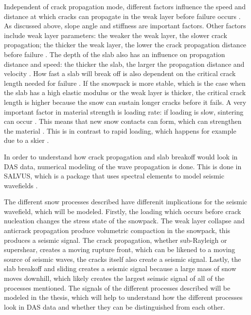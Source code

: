 \documentclass[10pt]{article}
\begin{document}
Independent of crack propagation mode, different factors influence the speed and distance at which cracks can propagate in the weak layer before failure occurs \parencite{gaumeDynamicAnticrackPropagation2018,gaumeSnowFractureRelation2017a,gaumeModelingCrackPropagation2015}. As discussed above, slope angle and stiffness are important factors. Other factors include weak layer parameters: the weaker the weak layer, the slower crack propagation; the thicker the weak layer, the lower the crack propagation distance before failure \parencite{gaumeModelingCrackPropagation2015}. The depth of the slab also has an influence on propagation distance and speed: the thicker the slab, the larger the propagation distance and velocity \parencite{gaumeModelingCrackPropagation2015}. How fast a slab will break off is also dependent on the critical crack length needed for failure \parencite{gaumeSnowFractureRelation2017a}. If the snowpack is more stable, which is the case when the slab has a high elastic modulus or the weak layer is thicker, the critical crack length is higher \parencite{gaumeSnowFractureRelation2017a} because the snow can sustain longer cracks before it fails. A very important factor in material strength is loading rate: if loading is slow, sintering can occur \parencite{mulakNumericalInvestigationMixedmode2019}. This means that new snow contacts can form, which can strengthen the material \parencite{mulakNumericalInvestigationMixedmode2019}. This is in contrast to rapid loading, which happens for example due to a skier \parencite{mulakNumericalInvestigationMixedmode2019}. 


In order to understand how crack propagation and slab breakoff would look in DAS data, numerical modeling of the wave propagation is done. This is done in SALVUS, which is a package that uses spectral elements to model seismic wavefields \parencite{afanasievSalvusFlexibleHighperformance2017}. \par

The different snow processes described have differenit implications for the seismic wavefield, which will be modeled. Firstly, the loading which occurs before crack nucleation changes the stress state of the snowpack. The weak layer collapse and anticrack propagation produce volumetric compaction in the snowpack, this produces a seismic signal. The crack propagation, whether sub-Rayleigh or supershear, creates a moving rupture front, which can be likened to a moving source of seismic waves, the cracks itself also create a seismic signal. Lastly, the slab breakoff and sliding creates a seismic signal because a large mass of snow moves downhill, which likely creates the largest seimsic signal of all of the processes mentioned. The signals of the different processes described will be modeled in the thesis, which will help to understand how the different processes look in DAS data and whether they can be distinguished from each other. \par
\end{document}
